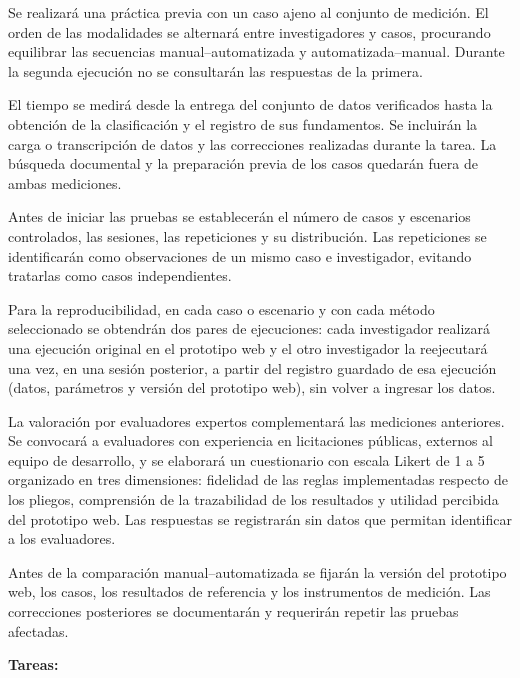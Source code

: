 \documentclass[12pt,a4paper]{article}
\begin{document}
Se realizará una práctica previa con un caso ajeno al conjunto de medición. El orden de las modalidades se alternará entre investigadores y casos, procurando equilibrar las secuencias manual–automatizada y automatizada–manual. Durante la segunda ejecución no se consultarán las respuestas de la primera.

El tiempo se medirá desde la entrega del conjunto de datos verificados hasta la obtención de la clasificación y el registro de sus fundamentos. Se incluirán la carga o transcripción de datos y las correcciones realizadas durante la tarea. La búsqueda documental y la preparación previa de los casos quedarán fuera de ambas mediciones.

Antes de iniciar las pruebas se establecerán el número de casos y escenarios controlados, las sesiones, las repeticiones y su distribución. Las repeticiones se identificarán como observaciones de un mismo caso e investigador, evitando tratarlas como casos independientes.

Para la reproducibilidad, en cada caso o escenario y con cada método seleccionado se obtendrán dos pares de ejecuciones: cada investigador realizará una ejecución original en el prototipo web y el otro investigador la reejecutará una vez, en una sesión posterior, a partir del registro guardado de esa ejecución (datos, parámetros y versión del prototipo web), sin volver a ingresar los datos.

La valoración por evaluadores expertos complementará las mediciones anteriores. Se convocará a evaluadores con experiencia en licitaciones públicas, externos al equipo de desarrollo, y se elaborará un cuestionario con escala Likert de 1 a 5 organizado en tres dimensiones: fidelidad de las reglas implementadas respecto de los pliegos, comprensión de la trazabilidad de los resultados y utilidad percibida del prototipo web. Las respuestas se registrarán sin datos que permitan identificar a los evaluadores.

Antes de la comparación manual–automatizada se fijarán la versión del prototipo web, los casos, los resultados de referencia y los instrumentos de medición. Las correcciones posteriores se documentarán y requerirán repetir las pruebas afectadas.

\textbf{Tareas:}
\end{document}

